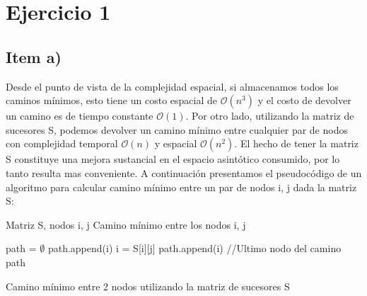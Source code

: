 \documentclass[10pt,a4paper]{article}
\begin{document}

\fecha{\today}



\maketitle

\tableofcontents
\newpage



\newpage

\section{Ejercicio 1}

\subsection{Item a)}

Desde el punto de vista de la complejidad espacial, si almacenamos todos los caminos mínimos, esto tiene un costo espacial de $\mathcal{O}(n^3)$ y el costo de devolver un camino es de tiempo constante $\mathcal{O}(1)$. Por otro lado, utilizando la matriz de sucesores S, podemos devolver un camino mínimo entre cualquier par de nodos con complejidad temporal $\mathcal{O}(n)$ y espacial $\mathcal{O}(n^2)$. El hecho de tener la matriz S constituye una mejora sustancial en el espacio asintótico consumido, por lo tanto resulta mas conveniente. A continuación presentamos el pseudocódigo de un algoritmo para calcular camino mínimo entre un par de nodos i, j dada la matriz S:

\begin{algorithm}[H]
	\begin{algorithmic}[1]
		\REQUIRE Matriz S, nodos i, j
		\ENSURE Camino mínimo entre los nodos i, j
		
		\STATE path = $\emptyset$
		    \STATE path.append(i)
		    \STATE i = S[i][j]
		\ENDWHILE
		\STATE path.append(i) //Ultimo nodo del camino
		\RETURN path
		
	\end{algorithmic}
	\caption{Camino mínimo entre 2 nodos utilizando la matriz de sucesores S}\label{alg:alg1a}
\end{algorithm}
\end{document}
